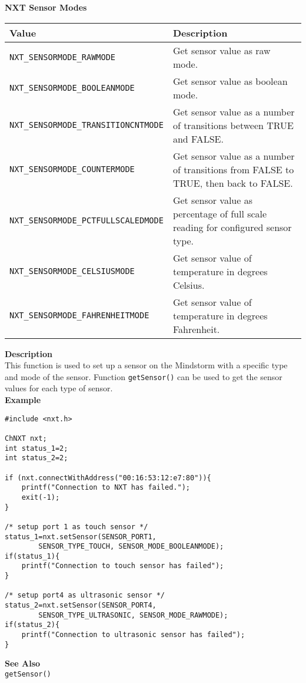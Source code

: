 \noindent
{\bf NXT Sensor Modes}\\
\begin{longtable}{p{6cm}p{9.5cm}}
Value & Description\\
\hline
{\tt NXT\_SENSORMODE\_RAWMODE}      &Get sensor value as raw mode.\\	 
{\tt NXT\_SENSORMODE\_BOOLEANMODE}  &Get sensor value as boolean mode.\\
{\tt NXT\_SENSORMODE\_TRANSITIONCNTMODE}  &Get sensor value as a number of transitions between TRUE and FALSE.\\
{\tt NXT\_SENSORMODE\_COUNTERMODE}  &Get sensor value as a number of transitions from FALSE to TRUE, then back to FALSE.\\
{\tt NXT\_SENSORMODE\_PCTFULLSCALEDMODE}  &Get sensor value as percentage of full scale reading for configured sensor type.\\
{\tt NXT\_SENSORMODE\_CELSIUSMODE}  &Get sensor value of temperature in degrees Celsius.\\
{\tt NXT\_SENSORMODE\_FAHRENHEITMODE}  &Get sensor value of temperature in degrees Fahrenheit.\\
\hline
\end{longtable}

\noindent
{\bf Description}\\
This function is used to set up a sensor on the Mindstorm with a specific type and mode of the sensor. Function {\tt getSensor()} can be used to get the sensor values for each type of sensor.\\

\noindent
{\bf Example}
\begin{verbatim}
#include <nxt.h> 

ChNXT nxt;
int status_1=2;
int status_2=2;

if (nxt.connectWithAddress("00:16:53:12:e7:80")){
    printf("Connection to NXT has failed.");
    exit(-1);
}
    
/* setup port 1 as touch sensor */
status_1=nxt.setSensor(SENSOR_PORT1, 
        SENSOR_TYPE_TOUCH, SENSOR_MODE_BOOLEANMODE);
if(status_1){
    printf("Connection to touch sensor has failed");
}

/* setup port4 as ultrasonic sensor */
status_2=nxt.setSensor(SENSOR_PORT4, 
        SENSOR_TYPE_ULTRASONIC, SENSOR_MODE_RAWMODE);
if(status_2){
    printf("Connection to ultrasonic sensor has failed");
}
\end{verbatim}

\noindent
{\bf See Also}\\
{\tt getSensor()}

